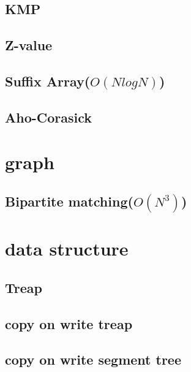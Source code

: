 \documentclass[12pt,twocolumn,oneside]{article}
\begin{document}
\subsection{KMP}


\subsection{Z-value}


\subsection{Suffix Array(\(O(N log N)\))}


\subsection{Aho-Corasick}


\section{graph}
\subsection{Bipartite matching(\(O(N^3)\))}


\section{data structure}
\subsection{Treap}


\subsection{copy on write treap}


\subsection{copy on write segment tree}

\end{document}
